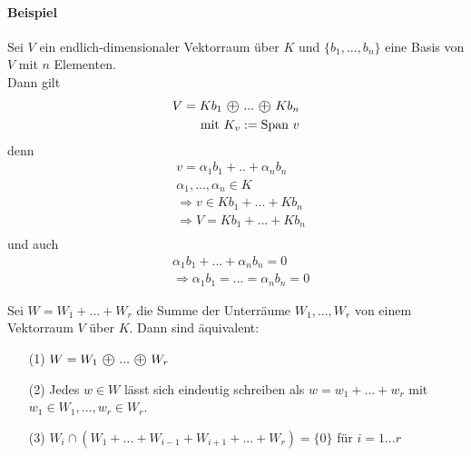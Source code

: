 \documentclass[11pt]{report}
\newcommand*\directsum{%
\text{ \textcircled{+} }
}
\begin{document}
\paragraph{Beispiel}
Sei $V$ ein endlich-dimensionaler Vektorraum über $K$ und $\{b_1, ..., b_n\}$ eine Basis von $V$ mit $n$ Elementen. \\
Dann gilt
\begin{align}
 V = K b_1 \directsum ... \directsum K b_n \\
\text{mit } K_v := \text{Span } v
\end{align}
denn
\begin{align}
&v = \alpha_1 b_1 + .. + \alpha_n b_n \\
&\alpha_1, ..., \alpha_n \in K \\
&\Rightarrow v \in K b_1+ ... + K b_n \\
&\Rightarrow V = K b_1 + ... + K b_n \\
\end{align}
und auch
\begin{align}
&\alpha_1 b_1 + ... + \alpha_n b_n = 0 \\
&\Rightarrow \alpha_1 b_1 = ... = \alpha_n b_n = 0
\end{align}

\begin{satz}
\label{satz432}
Sei $W = W_1 + ... + W_r$ die Summe der Unterräume $W_1, ..., W_r$ von einem Vektorraum $V$ über $K$.
Dann sind äquivalent:
\begin{itemize}
 \item[(1)] $W = W_1 \directsum ... \directsum W_r$
 \item[(2)] Jedes $w \in W$ lässt sich eindeutig schreiben als $w=w_1 + ... + w_r$ mit $w_1 \in W_1, ..., w_r \in W_r$.
 \item[(3)] $W_i \cap (W_1 + ... + W_{i-1}+ W_{i+1}+ ... + W_r) = \{0\}$ für $i=1...r$
\end{itemize}
\end{satz}
\end{document}
